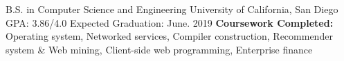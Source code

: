

\begin{cventries}

  \cventry
    {B.S. in Computer Science and Engineering} %
    {University of California, San Diego} %
    {GPA: 3.86/4.0} %
    {Expected Graduation: June. 2019} %
    {\textbf{Coursework Completed:} Operating system, Networked services, Compiler construction, Recommender system \& Web mining, Client-side web programming, Enterprise finance}

\end{cventries}
